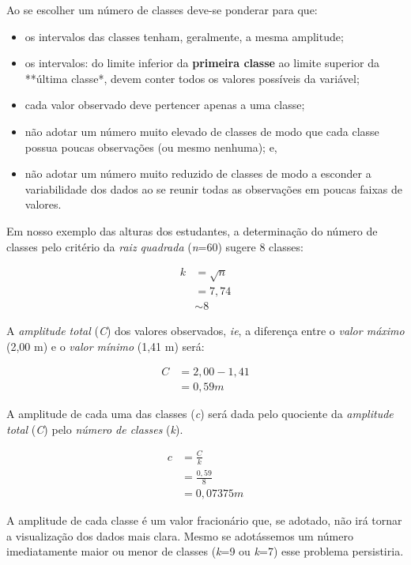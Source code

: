 \documentclass[
]{book}
\providecommand{\tightlist}{%
  \setlength{\itemsep}{0pt}\setlength{\parskip}{0pt}}
\begin{document}
\hfill\break

Ao se escolher um número de classes deve-se ponderar para que:

\begin{itemize}
\tightlist
\item
  os intervalos das classes tenham, geralmente, a mesma amplitude;
\item
  os intervalos: do limite inferior da \textbf{primeira classe} ao limite superior da **última classe*, devem conter todos os valores possíveis da variável;
\item
  cada valor observado deve pertencer apenas a uma classe;
\item
  não adotar um número muito elevado de classes de modo que cada classe possua poucas observações (ou mesmo nenhuma); e,
\item
  não adotar um número muito reduzido de classes de modo a esconder a variabilidade dos dados ao se reunir todas as observações em poucas faixas de valores.
\end{itemize}

Em nosso exemplo das alturas dos estudantes, a determinação do número de classes pelo critério da \emph{raiz quadrada} (\emph{n}=60) sugere 8 classes:

\begin{align*}
k & =\sqrt{n} \\
 & = 7,74 \\
 & \sim 8 
\end{align*}

A \emph{amplitude total} (\emph{C}) dos valores observados, \emph{ie}, a diferença entre o \emph{valor máximo} (2,00 m) e o \emph{valor mínimo} (1,41 m) será:

\begin{align*}
C & =2,00-1,41 \\
 & =0,59 m 
\end{align*}

A amplitude de cada uma das classes (\emph{c}) será dada pelo quociente da \emph{amplitude total} (\emph{C}) pelo \emph{número de classes} (\emph{k}).

\hfill\break

\begin{align*}
c & = \frac{C}{k} \\
  & = \frac{0,59}{8}\\ 
  & = 0,07375 m
\end{align*}

A amplitude de cada classe é um valor fracionário que, se adotado, não irá tornar a visualização dos dados mais clara. Mesmo se adotássemos um número imediatamente maior ou menor de classes (\emph{k}=9 ou \emph{k}=7) esse problema persistiria.
\end{document}
